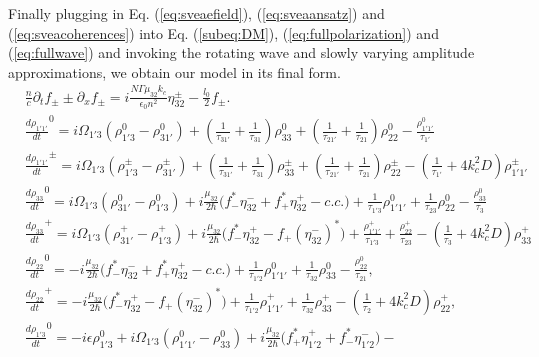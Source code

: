 \documentclass[10pt,letterpaper]{article}
\begin{document}
Finally plugging in Eq. (\ref{eq:sveaefield}), (\ref{eq:sveaansatz}) and (\ref{eq:sveacoherences}) into Eq. (\ref{subeq:DM}), (\ref{eq:fullpolarization}) and (\ref{eq:fullwave})  and invoking the rotating wave and slowly varying amplitude approximations, we obtain our model in its final form.
\begin{subequations}
	\label{eq:finalthreelevelmodel}
\begin{align}
&\frac{n}{c}\partial_t f_{\pm} \pm \partial_{x}f_{\pm} = i\frac{N \Gamma \mu_{32} k_c}{\epsilon_0 n^2} \eta_{32}^{\pm} - \frac{l_0}{2} f_{\pm} \label{eq:rtwave} .\\
&\frac{d \rho_{1'1'}}{d t}^{0} = i\Omega_{1'3} (\rho_{1'3}^{0} - \rho_{31'}^{0}) + (\frac{1}{\tau_{31'}} + \frac{1}{\tau_{31}})\rho_{33}^{0} 
 + (\frac{1}{\tau_{21'}} + \frac{1}{\tau_{21}})\rho_{22}^{0} - \frac{\rho_{1'1'}^{0}}{\tau_{1'}} \\
&\frac{d \rho_{1'1'}}{d t}^{\pm} = i\Omega_{1'3} (\rho_{1'3}^{\pm} - \rho_{31'}^{\pm}) + (\frac{1}{\tau_{31'}} + \frac{1}{\tau_{31}})\rho_{33}^{\pm}  
+ (\frac{1}{\tau_{21'}} + \frac{1}{\tau_{21}})\rho_{22}^{\pm} - (\frac{1}{\tau_{1'}} + 4k_c^2D )\rho_{1'1'}^{\pm}  \label{eq:rtpop1grating}\\
&\frac{d \rho_{33}}{d t}^0 = i\Omega_{1'3} (\rho_{31'}^0 - \rho_{1'3}^0) + i\frac{\mu_{32}}{2\hbar} \big (f_{-}^*\eta_{32}^{-}+f_{+}^*\eta_{32}^{+} - c.c. \big )+ \frac{1}{\tau_{1'3}}\rho_{1'1'}^0 +  \frac{1}{\tau_{23}}\rho_{22}^0 - \frac{\rho_{33}^0}{\tau_{3}}  \\
&\frac{d \rho_{33}}{d t}^{+}   = i\Omega_{1'3} (\rho_{31'}^{+} - \rho_{1'3}^{+}) + i\frac{\mu_{32}}{2\hbar}\big ( f_{-}^*\eta_{32}^{+}-f_{+}(\eta_{32}^{-})^* \big ) 
+ \frac{\rho_{1'1'}^+}{\tau_{1'3}} +  \frac{\rho_{22}^+}{\tau_{23}} - (\frac{1}{\tau_{3}} +4k_c^2D) \rho_{33}^+ \label{eq:rtpop3grating}\\
&\frac{d \rho_{22}}{d t}^{0}  = -i\frac{\mu_{32}}{2\hbar} \big (f_{-}^*\eta_{32}^{-}+f_{+}^*\eta_{32}^{+} - c.c. \big ) + \frac{1}{\tau_{1'2}}\rho_{1'1'}^0  +  \frac{1}{\tau_{32}}\rho_{33}^{0} - \frac{\rho_{22}^0}{\tau_{21}} , \\
&\frac{d \rho_{22}}{d t}^{+}   = - i\frac{\mu_{32}}{2\hbar}\big ( f_{-}^*\eta_{32}^{+}-f_{+}(\eta_{32}^{-})^* \big )  + \frac{1}{\tau_{1'2}}\rho_{1'1'}^+  +  \frac{1}{\tau_{32}}\rho_{33}^+ - (\frac{1}{\tau_{2}}+4k_c^2D) \rho_{22}^+ , \label{eq:rtpop2grating}\\
&\frac{d \rho_{1'3}}{d t}^0  = -i\epsilon\rho_{1'3}^0 +i \Omega_{1'3}(\rho_{1'1'}^{0} - \rho_{33}^{0}) +i\frac{\mu_{32}}{2 \hbar}\big (f_{+}^*\eta_{1'2}^{+}+f_{-}^*\eta_{1'2}^{-} \big ) -

\end{align}
\end{subequations}
\end{document}
